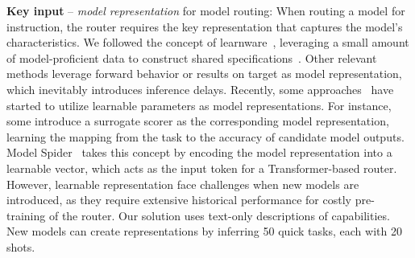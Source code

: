 \textbf{Key input} -- \textit{model representation} for model routing:
When routing a model for instruction, the router requires the key representation that captures the model's characteristics. We followed the concept of learnware~\cite{DBLP:journals/fcsc/Zhou16a}, leveraging a small amount of model-proficient data to construct shared specifications~\cite{DBLP:journals/chinaf/ZhouT24,DBLP:conf/kdd/TanLBTZLXZYZ24}.
Other relevant methods leverage forward behavior or results on target as model representation, which inevitably introduces inference delays.
Recently, some approaches~\cite{lu2024blending,srivatsa2024harnessing,ding2024hybrid,DBLP:journals/corr/abs-2410-03834} have started to utilize learnable parameters as model representations.
For instance, some introduce a surrogate scorer as the corresponding model representation, learning the mapping from the task to the accuracy of candidate model outputs.
Model Spider~\cite{DBLP:conf/nips/ZhangHDZY23} takes this concept by encoding the model representation into a learnable vector, which acts as the input token for a Transformer-based router. However, learnable representation face challenges when new models are introduced, as they require extensive historical performance for costly pre-training of the router.
Our solution uses text-only descriptions of capabilities. New models can create representations by inferring 50 quick tasks, each with 20 shots.
